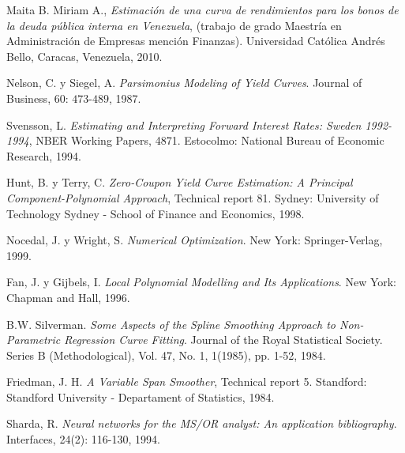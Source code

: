 \begin{thebibliography}{99}

 {\sc Maita B. Miriam A.}, {\it Estimaci\'on de una curva de rendimientos para los bonos de la deuda p\'ublica interna en Venezuela}, (trabajo de grado Maestr\'ia en Administraci\'on de Empresas menci\'on Finanzas).  Universidad Cat\'olica Andr\'es Bello, Caracas, Venezuela, 2010.

 {\sc Nelson, C. y Siegel, A.} {\it Parsimonius Modeling of Yield Curves}. Journal of
Business, $60$: $473$-$489$, 1987.

 {\sc Svensson, L.} {\it Estimating and Interpreting Forward Interest Rates: Sweden 1992-1994}, NBER Working Papers, 4871. Estocolmo: National Bureau of Economic Research, 1994.

 Hunt, B. y Terry, C. {\it Zero-Coupon Yield Curve Estimation: A Principal Component-Polynomial Approach}, Technical report 81. Sydney: University of Technology Sydney - School of Finance and Economics, 1998.

 Nocedal, J. y Wright, S. {\it Numerical Optimization}. New York: Springer-Verlag, 1999.


 Fan, J. y Gijbels, I. {\it Local Polynomial Modelling and Its Applications}. New York: Chapman and Hall, 1996.

 B.W. Silverman. {\it Some Aspects of the Spline Smoothing Approach to Non-Parametric Regression Curve Fitting}. Journal of the Royal Statistical Society. Series B (Methodological), Vol. 47, No. 1, 1(1985), pp. 1-52, 1984.


 Friedman, J. H. {\it A Variable Span Smoother}, Technical report 5. Standford:
Standford University - Departament of Statistics, 1984.


 Sharda, R. {\it Neural networks for the MS/OR analyst: An application bibliography}. Interfaces, 24(2): 116-130, 1994.



\end{thebibliography}
